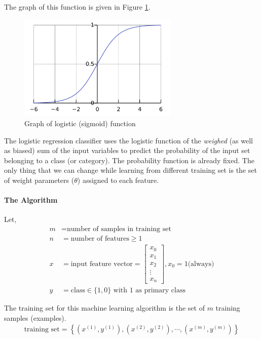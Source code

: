 The graph of this function is given in Figure \ref{fig:sigmoid}.
\begin{figure}[h!]\centering
  \includegraphics[width=3in]{fig/sigmoid}
  \caption{Graph of logistic (sigmoid) function}\label{fig:sigmoid}
\end{figure}

The logistic regression classifier uses the logistic function of the {\em weighed}
(as well as biased) sum of the input variables to predict the probability of
the input set belonging to a class (or category). The probability function is
already fixed. The only thing that we can change while learning from different
training set is the set of weight parameters ($\theta$) assigned to each feature.

\paragraph{The Algorithm}\hfill

Let,
\begin{align}
  m &= \text{number of samples in training set}
  \nonumber\\
  n &= \text{number of features} \ge 1
  \nonumber\\
  x &= \text{input feature vector} =
  \begin{bmatrix}
  x_0 \\ x_1 \\ x_2 \\ \vdots \\ x_n
  \end{bmatrix}, x_0 = 1 \text{(always)}
  \nonumber\\
  y &= \text{class} \in \{ 1, 0 \} \text{ with 1 as primary class}
  \nonumber
\end{align}

The training set for this machine learning algorithm is the set of $m$ training
samples (examples).
\begin{align}
  \text{training set} = 
  \left\{ (x^{(1)}, y^{(1)}), (x^{(2)}, y^{(2)}), \cdots , (x^{(m)}, y^{(m)}) \right\}
  \label{eqn:training-set}
\end{align}


